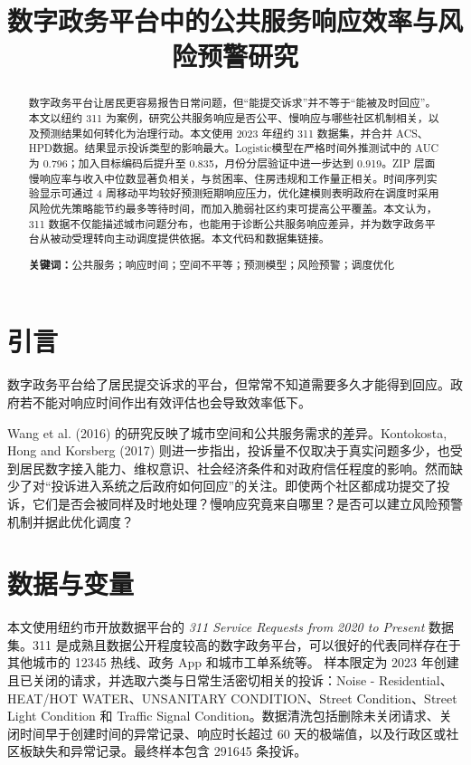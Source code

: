 \documentclass[UTF8,a4paper,12pt]{ctexart}
\title{数字政务平台中的公共服务响应效率与风险预警研究}
\author{}
\date{}
\begin{document}
\maketitle

\begin{abstract}
数字政务平台让居民更容易报告日常问题，但“能提交诉求”并不等于“能被及时回应”。本文以纽约 311 为案例，研究公共服务响应是否公平、慢响应与哪些社区机制相关，以及预测结果如何转化为治理行动。本文使用 2023 年纽约 311 数据集，并合并 ACS、HPD数据。结果显示投诉类型的影响最大。Logistic模型在严格时间外推测试中的 AUC 为 0.796；加入目标编码后提升至 0.835，月份分层验证中进一步达到 0.919。ZIP 层面慢响应率与收入中位数显著负相关，与贫困率、住房违规和工作量正相关。时间序列实验显示可通过 4 周移动平均较好预测短期响应压力，优化建模则表明政府在调度时采用风险优先策略能节约最多等待时间，而加入脆弱社区约束可提高公平覆盖。本文认为，311 数据不仅能描述城市问题分布，也能用于诊断公共服务响应差异，并为数字政务平台从被动受理转向主动调度提供依据。本文代码和数据集链接。

\textbf{关键词：}公共服务；响应时间；空间不平等；预测模型；风险预警；调度优化
\end{abstract}

\section{引言}

数字政务平台给了居民提交诉求的平台，但常常不知道需要多久才能得到回应。政府若不能对响应时间作出有效评估也会导致效率低下。

Wang et al. (2016) 的研究反映了城市空间和公共服务需求的差异。Kontokosta, Hong and Korsberg (2017) 则进一步指出，投诉量不仅取决于真实问题多少，也受到居民数字接入能力、维权意识、社会经济条件和对政府信任程度的影响。然而缺少了对“投诉进入系统之后政府如何回应”的关注。即使两个社区都成功提交了投诉，它们是否会被同样及时地处理？慢响应究竟来自哪里？是否可以建立风险预警机制并据此优化调度？


\section{数据与变量}
本文使用纽约市开放数据平台的 \textit{311 Service Requests from 2020 to Present} 数据集。311 是成熟且数据公开程度较高的数字政务平台，可以很好的代表同样存在于其他城市的 12345 热线、政务 App 和城市工单系统等。
样本限定为 2023 年创建且已关闭的请求，并选取六类与日常生活密切相关的投诉：Noise - Residential、HEAT/HOT WATER、UNSANITARY CONDITION、Street Condition、Street Light Condition 和 Traffic Signal Condition。数据清洗包括删除未关闭请求、关闭时间早于创建时间的异常记录、响应时长超过 60 天的极端值，以及行政区或社区板缺失和异常记录。最终样本包含 291645 条投诉。
\end{document}
